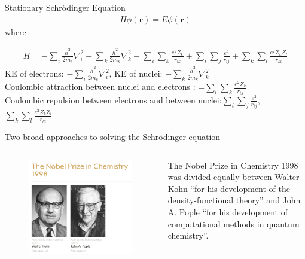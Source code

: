 \documentclass[aspectratio=169]{beamer}
\let \vec \mathbf
\begin{document}
    \begin{frame}{Stationary Schr\"odinger Equation}
        \begin{eqnarray*}
            H\phi(\vec{r}) = E\phi(\vec{r})
        \end{eqnarray*}
        where

        \begin{eqnarray*}
            H = -\sum_i \frac{\bar{h}^2}{2m_e}\nabla_i^2
            -\sum_k \frac{\bar{h}^2}{2m_k}\nabla_k^2
            -\sum_i\sum_k \frac{e^2Z_k}{r_{ik}}
            +\sum_i\sum_j \frac{e^2}{r_{ij}}
            +\sum_k\sum_l \frac{e^2Z_kZ_l}{r_{kl}}
        \end{eqnarray*}
        KE of electrons: $-\sum_i \frac{\bar{h}^2}{2m_e}\nabla_i^2$, KE of nuclei: $-\sum_k \frac{\bar{h}^2}{2m_k}\nabla_k^2$\\
        Coulombic attraction between nuclei and electrons : $-\sum_i\sum_k \frac{e^2Z_k}{r_{ik}}$\\
        Coulombic repulsion between electrons and between nuclei:$\sum_i\sum_j \frac{e^2}{r_{ij}}$, $\sum_k\sum_l \frac{e^2Z_kZ_l}{r_{kl}}$

    \end{frame}

    \begin{frame}{Two broad approaches to solving the Schr\"odinger equation}
        \begin{columns}
            \begin{figure}
                \centering
                \includegraphics[width=0.9\linewidth]{lectures/figures/1_nobelprizes.png}
            \end{figure}
            The Nobel Prize in Chemistry 1998 was divided equally between Walter Kohn ``for his development of the density-functional theory'' and John A. Pople ``for his development of computational methods in quantum chemistry''.

        \end{columns}

    \end{frame}
\end{document}
